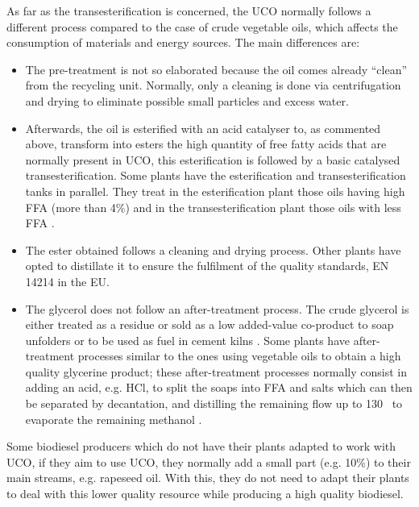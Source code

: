 \documentclass[sustainability,article,submit,moreauthors,pdftex,12pt,a4paper]{mdpi}
\newcommand{\degreeC}[1]{#1~\textcelsius}
\begin{document}
As far as the transesterification is concerned, the UCO normally follows a different process compared to the case of crude vegetable oils, which affects the consumption of materials and energy sources. The main differences are:
\begin{itemize}
\item The pre-treatment is not so elaborated because the oil comes already ``clean'' from the recycling unit. Normally, only a cleaning is done via centrifugation and drying to eliminate possible small particles and excess water.
\item Afterwards, the oil is esterified with an acid catalyser to, as commented above, transform into esters the high quantity of free fatty acids that are normally present in UCO, this esterification is followed by a basic catalysed transesterification. Some plants have the esterification and transesterification tanks in parallel. They treat in the esterification plant those oils having high FFA (more than 4\%) and in the transesterification plant those oils with less FFA \cite{CIEMAT2005}.
\item The ester obtained follows a cleaning and drying process. Other plants have opted to distillate it to ensure the fulfilment of the quality standards, EN 14214 \cite{CENEN14214} in the EU.
\item The glycerol does not follow an after-treatment process. The crude glycerol is either treated as a residue or sold as a low added-value co-product to soap unfolders or to be used as fuel in cement kilns \cite{FontdeMoraThesis2013}. Some plants have after-treatment processes similar to the ones using vegetable oils to obtain a high quality glycerine product; these after-treatment processes normally consist in adding an acid, e.g. HCl, to split the soaps into FFA and salts which can then be separated by decantation, and distilling the remaining flow up to \degreeC{130} to evaporate the remaining methanol \cite{FontdeMoraThesis2013}.
\end{itemize}

Some biodiesel producers which do not have their plants adapted to work with UCO, if they aim to use UCO, they normally add a small part (e.g. 10\%) to their main streams, e.g. rapeseed oil. With this, they do not need to adapt their plants to deal with this lower quality resource while producing a high quality biodiesel.
\end{document}
